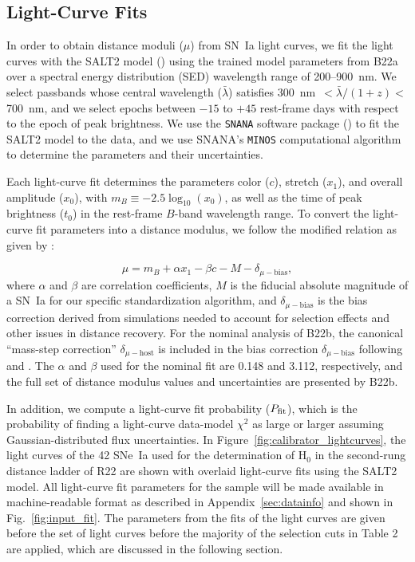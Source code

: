 \documentclass[twocolumn]{aastex63}
\begin{document}
\subsection{Light-Curve Fits}
\label{sec:light curves}


In order to obtain distance moduli ($\mu$) from SN~Ia light curves, we fit the light curves with the SALT2 model (\citealt{Guy07}) using the trained model parameters from B22a over a spectral energy distribution (SED) wavelength range of 200--900~nm. We select passbands whose central wavelength ($\bar\lambda$) 
satisfies 300~nm~$< \bar\lambda/(1+z) < $700~nm, and we select epochs between $-15$ to $+45$ rest-frame days with respect to the epoch
of peak brightness. We use the \texttt{SNANA} software package (\citealt{Kessler2009}) to fit the SALT2 model to the data, and we use SNANA's \texttt{MINOS} computational algorithm to determine the parameters and their uncertainties. 

Each light-curve fit determines the parameters color ($c$), stretch ($x_1$), and overall amplitude ($x_0$), with $m_B \equiv -2.5\log_{10}(x_0)$, as well as the time of peak brightness ($t_0$) in the rest-frame $B$-band wavelength range.  To convert the light-curve fit parameters into a distance modulus, we follow the modified \cite{Tripp} relation as given by \cite{Brout2019}:

\begin{equation}
    \mu=m_B+\alpha x_1 - \beta c - M - \delta_{\mu - \textrm {bias}},
    \label{eqn:Tripp}
\end{equation}
where $\alpha$ and $\beta$ are correlation coefficients, $M$ is the fiducial absolute magnitude of a SN~Ia for our specific standardization algorithm, and $\delta_{\mu - \textrm {bias}}$ is the bias correction derived from simulations needed to account for selection effects and other issues in distance recovery.  For the nominal analysis of B22b, the canonical ``mass-step correction'' $\delta_{\mu - \textrm {host}}$ is  included in the bias correction $\delta_{\mu - \textrm {bias}}$ following \cite{bs20} and \cite{Popovic21}.  The $\alpha$ and $\beta$ used for the nominal fit are 0.148 and 3.112, respectively, and the full set of distance modulus values and uncertainties are presented by B22b.

In addition, we compute a light-curve fit probability ($P_{\rm fit}$), which is the probability of finding a light-curve data-model $\chi^2$ as large or larger assuming Gaussian-distributed flux uncertainties. In Figure~\ref{fig:calibrator_lightcurves}, the light curves of the 42 SNe~Ia used for the determination of H$_0$ in the second-rung distance ladder of R22 are shown with overlaid light-curve fits using the SALT2 model.  All light-curve fit parameters for the sample will be made available in machine-readable format as described in Appendix~\ref{sec:datainfo} and shown in Fig.~\ref{fig:input_fit}.  The parameters from the fits of the light curves are given before the set of light curves before the majority of the selection cuts in Table 2 are applied, which are discussed in the following section.
\end{document}
